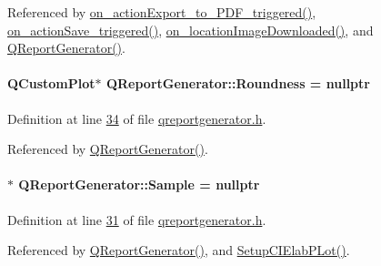 Referenced by \hyperlink{qreportgenerator_8cpp_source_l00416}{on\+\_\+action\+Export\+\_\+to\+\_\+\+P\+D\+F\+\_\+triggered()}, \hyperlink{qreportgenerator_8cpp_source_l00401}{on\+\_\+action\+Save\+\_\+triggered()}, \hyperlink{qreportgenerator_8cpp_source_l00376}{on\+\_\+location\+Image\+Downloaded()}, and \hyperlink{qreportgenerator_8cpp_source_l00004}{Q\+Report\+Generator()}.

\hypertarget{class_q_report_generator_ad0dd77389aea1b1fb2a58e363e5ff8a1}{}
\paragraph[{Roundness}]{\setlength{\rightskip}{0pt plus 5cm}Q\+Custom\+Plot$\ast$ Q\+Report\+Generator\+::\+Roundness = nullptr}\label{class_q_report_generator_ad0dd77389aea1b1fb2a58e363e5ff8a1}


Definition at line \hyperlink{qreportgenerator_8h_source_l00034}{34} of file \hyperlink{qreportgenerator_8h_source}{qreportgenerator.\+h}.



Referenced by \hyperlink{qreportgenerator_8cpp_source_l00004}{Q\+Report\+Generator()}.

\hypertarget{class_q_report_generator_a779d8c539bb762daccaf61189cedcae5}{}
\paragraph[{Sample}]{$\ast$ Q\+Report\+Generator\+::\+Sample = nullptr}\label{class_q_report_generator_a779d8c539bb762daccaf61189cedcae5}


Definition at line \hyperlink{qreportgenerator_8h_source_l00031}{31} of file \hyperlink{qreportgenerator_8h_source}{qreportgenerator.\+h}.



Referenced by \hyperlink{qreportgenerator_8cpp_source_l00004}{Q\+Report\+Generator()}, and \hyperlink{qreportgenerator_8cpp_source_l00431}{Setup\+C\+I\+Elab\+P\+Lot()}.

\hypertarget{class_q_report_generator_a5e75a3f9447c0c24b32cd198a00af21c}{}
